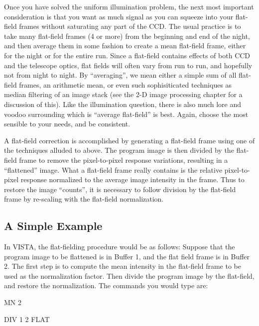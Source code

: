 Once you have solved the uniform illumination problem, the next most important
consideration is that you want as much signal as you can squeeze into your
flat-field frames without saturating any part of the CCD.  The usual practice
is to take many flat-field frames (4 or more) from the beginning and end of
the night, and then average them in some fashion to create a mean flat-field
frame, either for the night or for the entire run.  Since a flat-field
contains effects of both CCD and the telescope optics, flat fields will often
vary from run to run, and hopefully not from night to night.  By
``averaging'', we mean either a simple sum of all flat-field frames, an
arithmetic mean, or even such sophisiticated techniques as median filtering of
an image stack (see the 2-D image processing chapter for a discussion of
this).  Like the illumination question, there is also much lore and voodoo
surrounding which is ``average flat-field'' is best.  Again, choose the most
sensible to your needs, and be consistent. 

A flat-field correction is accomplished by generating a flat-field frame using
one of the techniques alluded to above.  The program image is then divided
by the flat-field frame to remove the pixel-to-pixel response variations, 
resulting in a ``flattened'' image.  What a flat-field frame really contains
is the relative pixel-to-pixel response normalized to the average 
image intensity in the frame.  Thus to restore the image ``counts'', it
is necessary to follow division by the flat-field frame by re-scaling
with the flat-field normalization.

\subsection{A Simple Example}
\nobreak
In VISTA, the flat-fielding procedure would be as follows:  Suppose that
the program image to be flattened is in Buffer 1, and the flat field
frame is in Buffer 2.  The first step is to compute the mean intensity
in the flat-field frame to be used as the normalization factor.  Then
divide the program image by the flat-field, and restore the normalization.
The commands you would type are:

\begin{command}
      \item MN 2
      \item DIV 1 2 FLAT
\end{command}

